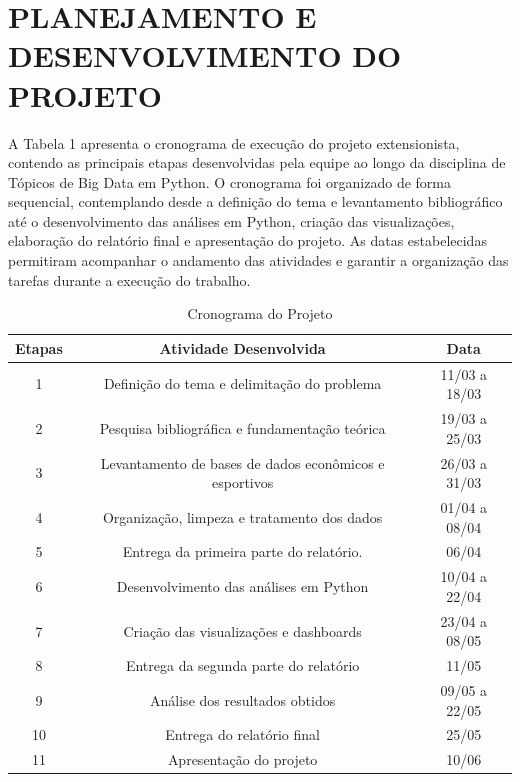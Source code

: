 \documentclass[12pt, a4paper, brazil]{article}
\begin{document}
\section{PLANEJAMENTO E DESENVOLVIMENTO DO PROJETO}
A Tabela 1 apresenta o cronograma de execução do projeto extensionista, contendo as principais etapas desenvolvidas pela equipe ao longo da disciplina de Tópicos de Big Data em Python. O cronograma foi organizado de forma sequencial, contemplando desde a definição do tema e levantamento bibliográfico até o desenvolvimento das análises em Python, criação das visualizações, elaboração do relatório final e apresentação do projeto. As datas estabelecidas permitiram acompanhar o andamento das atividades e garantir a organização das tarefas durante a execução do trabalho.
    \begin{table}[h!]
        \centering
        \begin{tabular}{|c|c|c|}\hline
            \textbf{Etapas} & \textbf{Atividade Desenvolvida} & \textbf{Data} \\ \hline
            1 & Definição do tema e delimitação do problema & 11/03 a 18/03 \\ \hline
            2 & Pesquisa bibliográfica e fundamentação teórica & 19/03 a 25/03 \\ \hline
            3 & Levantamento de bases de dados econômicos e esportivos & 26/03 a 31/03 \\ \hline
            4 & Organização, limpeza e tratamento dos dados  & 01/04 a 08/04 \\ \hline
            5 & Entrega da primeira parte do relatório. & 06/04 \\ \hline
            6 & Desenvolvimento das análises em Python & 10/04 a 22/04 \\ \hline
            7 & Criação das visualizações e dashboards & 23/04 a 08/05 \\ \hline
            8 & Entrega da segunda parte do relatório & 11/05 \\ \hline
            9 & Análise dos resultados obtidos & 09/05 a 22/05 \\ \hline
            10 & Entrega do relatório final & 25/05 \\ \hline
            11 & Apresentação do projeto & 10/06 \\ \hline
        \end{tabular}
        \caption{Cronograma do Projeto}
        \label{tab:placeholder}
    \end{table}
\end{document}
